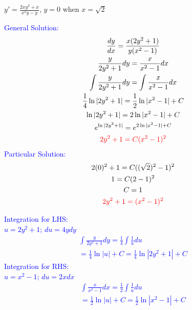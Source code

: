 \item $y'=\frac{2xy^2 + x}{x^2y-y}$, $y=0$ when $x=\sqrt2$

\textcolor{blue}{
    \begin{minipage}[t]{0.45\textwidth}
        General Solution:
        \begin{gather*}
            \frac{dy}{dx}=\frac{x(2y^2 + 1)}{y(x^2-1)}\\
            \frac{y}{2y^2 + 1}dy=\frac{x}{x^2-1}dx\\
            \int\frac{y}{2y^2 + 1}dy=\int\frac{x}{x^2-1}dx\\
            \frac{1}{4}\ln|2y^2 + 1|=\frac{1}{2}\ln|x^2 - 1|+C\\
            \ln|2y^2 + 1|=2\ln|x^2 - 1|+C\\
            e^{\ln|2y^2 + 1|}=e^{2\ln|x^2 - 1|+C}\\
            \textcolor{red}{
                2y^2 + 1=C(x^2 - 1)^2
            }
        \end{gather*}
        Particular Solution:
        \begin{gather*}
            2(0)^2 + 1=C((\sqrt2)^2 - 1)^2\\
            1=C(2 - 1)^2\\
            C = 1\\
            \textcolor{red}{
                2y^2 + 1=(x^2 - 1)^2
            }
        \end{gather*}
    \end{minipage}
    \hfill
    \begin{minipage}[t]{0.45\textwidth}
        Integration for LHS:\\
        $u=2y^2 + 1$; $du = 4ydy$
        \begin{gather*}
            \int\frac{y}{2y^2 + 1}dy = \frac{1}{4}\int\frac{1}{u}du\\
            = \frac{1}{4}\ln|u|+C=\frac{1}{4}\ln|2y^2 + 1|+C
        \end{gather*}
        Integration for RHS:\\
        $u=x^2 - 1$; $du = 2xdx$
        \begin{gather*}
            \int\frac{x}{x^2-1}dx = \frac{1}{2}\int\frac{1}{u}du\\
            = \frac{1}{2}\ln|u|+C=\frac{1}{2}\ln|x^2 - 1|+C
        \end{gather*}
    \end{minipage}
}